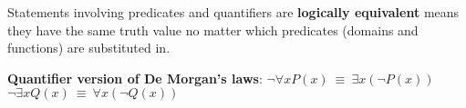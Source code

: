 
Statements involving predicates and quantifiers are {\bf logically equivalent} 
means they have the same truth value no matter which predicates (domains and functions) are substituted in. 

{\bf Quantifier version of De Morgan's laws}: 
$\boxed{\neg \forall x P(x) ~\equiv~ \exists x \left( \neg P(x) \right)}$
\qquad
\qquad
$\boxed{\neg \exists x Q(x) ~\equiv~ \forall x \left( \neg Q(x) \right)}$
